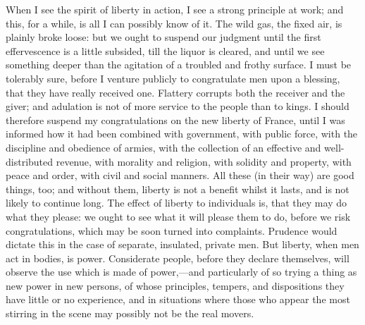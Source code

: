 When I see the spirit of liberty in action, I see a strong principle at work; and this, for a while, is all I can possibly know of it. The wild gas, the fixed air, is plainly broke loose: but we ought to suspend our judgment until the first effervescence is a little subsided, till the liquor is cleared, and until we see something deeper than the agitation of a troubled and frothy surface. I must be tolerably sure, before I venture publicly to congratulate men upon a blessing, that they have really received one. Flattery corrupts both the receiver and the giver; and adulation is not of more service to the people than to kings. I should therefore suspend my congratulations on the new liberty of France, until I was informed how it had been combined with government, with public force, with the discipline and obedience of armies, with the collection of an effective and well-distributed revenue, with morality and religion, with solidity and property, with peace and order, with civil and social manners. All these (in their way) are good things, too; and without them, liberty is not a benefit whilst it lasts, and is not likely to continue long. The effect of liberty to individuals is, that they may do what they please: we ought to see what it will please them to do, before we risk congratulations, which may be soon turned into complaints. Prudence would dictate this in the case of separate, insulated, private men. But liberty, when men act in bodies, is power. Considerate people, before they declare themselves, will observe the use which is made of power,—and particularly of so trying a thing as new power in new persons, of whose principles, tempers, and dispositions they have little or no experience, and in situations where those who appear the most stirring in the scene may possibly not be the real movers.

